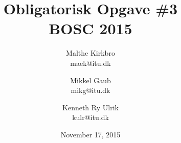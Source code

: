 \documentclass{article}
\title{\textbf{\huge{Obligatorisk Opgave \#3 \\ BOSC 2015}}}
\author{
		Malthe Kirkbro\\
		maek@itu.dk
		\and
		Mikkel Gaub\\
		mikg@itu.dk
		\and
		Kenneth Ry Ulrik\\
		kulr@itu.dk
	}
\date{November 17, 2015}
\begin{document}
\maketitle
\newpage

\renewcommand{\contentsname}{Indholdsfortegnelse}
\tableofcontents

\newpage

\FloatBarrier


\FloatBarrier


\FloatBarrier


\FloatBarrier


\FloatBarrier


\FloatBarrier

\end{document}
